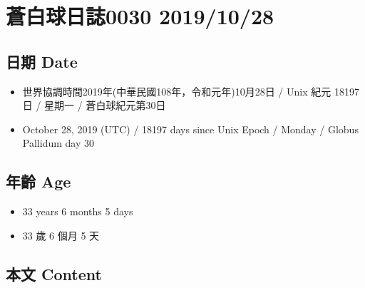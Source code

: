 \documentclass[
]{article}
\providecommand{\tightlist}{%
  \setlength{\itemsep}{0pt}\setlength{\parskip}{0pt}}
\begin{document}
\hypertarget{ux84bcux767dux7403ux65e5ux8a8c0030-20191028}{%
\section{蒼白球日誌0030
2019/10/28}\label{ux84bcux767dux7403ux65e5ux8a8c0030-20191028}}

\hypertarget{ux65e5ux671f-date-29}{%
\subsection{日期 Date}\label{ux65e5ux671f-date-29}}

\begin{itemize}
\tightlist
\item
  世界協調時間2019年(中華民國108年，令和元年)10月28日 / Unix 紀元 18197
  日 / 星期一 / 蒼白球紀元第30日
\item
  October 28, 2019 (UTC) / 18197 days since Unix Epoch / Monday / Globus
  Pallidum day 30
\end{itemize}

\hypertarget{ux5e74ux9f61-age-29}{%
\subsection{年齡 Age}\label{ux5e74ux9f61-age-29}}

\begin{itemize}
\tightlist
\item
  33 years 6 months 5 days
\item
  33 歲 6 個月 5 天
\end{itemize}

\hypertarget{ux672cux6587-content-29}{%
\subsection{本文 Content}\label{ux672cux6587-content-29}}
\end{document}
